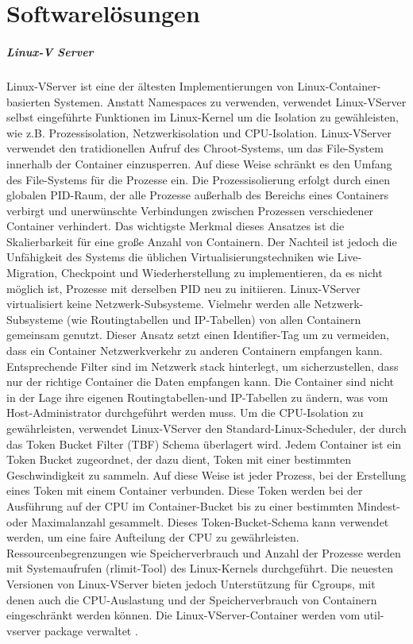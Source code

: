 \thispagestyle{empty}

\section{Softwarelösungen}

\subparagraph{Linux-V Server}
Linux-VServer ist eine der ältesten Implementierungen von Linux-Container-basierten Systemen. Anstatt Namespaces zu verwenden, verwendet Linux-VServer selbst eingeführte Funktionen im Linux-Kernel um die Isolation zu gewähleisten, wie z.B. Prozessisolation, Netzwerkisolation und CPU-Isolation. Linux-VServer verwendet den tratidionellen Aufruf des Chroot-Systems, um das File-System innerhalb der Container einzusperren. Auf diese Weise schränkt es den Umfang des File-Systems für die Prozesse ein. Die Prozessisolierung erfolgt durch einen globalen PID-Raum, der alle Prozesse außerhalb des Bereichs eines Containers verbirgt und unerwünschte Verbindungen zwischen Prozessen verschiedener Container verhindert. Das wichtigste Merkmal dieses Ansatzes ist die Skalierbarkeit für eine große Anzahl von Containern. Der Nachteil ist jedoch die Unfähigkeit des Systems die üblichen Virtualisierungstechniken wie Live-Migration, Checkpoint und Wiederherstellung zu implementieren, da es nicht möglich ist, Prozesse mit derselben PID neu zu initiieren. Linux-VServer virtualisiert keine Netzwerk-Subsysteme. Vielmehr werden alle Netzwerk-Subsysteme (wie Routingtabellen und IP-Tabellen) von allen Containern gemeinsam genutzt. Dieser Ansatz setzt einen Identifier-Tag um zu vermeiden, dass ein Container Netzwerkverkehr zu anderen Containern empfangen kann. Entsprechende Filter sind im Netzwerk stack hinterlegt, um sicherzustellen, dass nur der richtige Container die Daten empfangen kann. Die Container sind nicht in der Lage ihre eigenen Routingtabellen-und IP-Tabellen zu ändern, was vom Host-Administrator durchgeführt werden muss. Um die CPU-Isolation zu gewährleisten, verwendet Linux-VServer den Standard-Linux-Scheduler, der durch das Token Bucket Filter (TBF) Schema überlagert wird. Jedem Container ist ein Token Bucket zugeordnet, der dazu dient, Token mit einer bestimmten Geschwindigkeit zu sammeln. Auf diese Weise ist jeder Prozess, bei der Erstellung eines Token mit einem Container verbunden. Diese Token werden bei der Ausführung auf der CPU im Container-Bucket bis zu einer bestimmten Mindest- oder Maximalanzahl gesammelt. Dieses Token-Bucket-Schema kann verwendet werden, um eine faire Aufteilung der CPU zu gewährleisten. Ressourcenbegrenzungen wie Speicherverbrauch und Anzahl der Prozesse werden mit Systemaufrufen (rlimit-Tool) des Linux-Kernels durchgeführt. Die neuesten Versionen von Linux-VServer bieten jedoch Unterstützung für Cgroups, mit denen auch die CPU-Auslastung und der Speicherverbrauch von Containern eingeschränkt werden können. Die Linux-VServer-Container werden vom util-vserver\cite{Optionen2018Userspace-WerkzeugeLinux-VServer} package verwaltet \cite{Overview2018PaperLinux-VServer} \cite{Xavier2015AClouds}.

